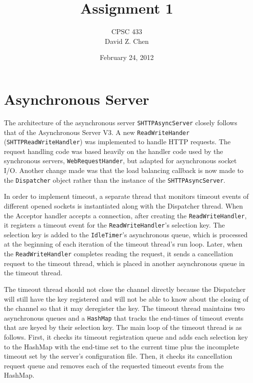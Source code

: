 \documentclass[letterpaper,12pt]{article}
\begin{document}
\title{Assignment 1}
\date{February 24, 2012}
\author{CPSC 433 \\ David Z. Chen}

\maketitle

\section{Asynchronous Server}

The architecture of the asynchronous server \texttt{SHTTPAsyncServer} closely follows that of the Asynchronous Server V3. A new \texttt{ReadWriteHander} (\texttt{SHTTPReadWriteHandler}) was implemented to handle HTTP requests. The request handling code was based heavily on the handler code used by the synchronous servers, \texttt{WebRequestHander}, but adapted for asynchronous socket I/O. Another change made was that the load balancing callback is now made to the \texttt{Dispatcher} object rather than the instance of the \texttt{SHTTPAsyncServer}.

In order to implement timeout, a separate thread that monitors timeout events of different opened sockets is instantiated along with the Dispatcher thread. When the Acceptor handler accepts a connection, after creating the \texttt{ReadWriteHandler}, it registers a timeout event for the \texttt{ReadWriteHandler}'s selection key. The selection key is added to the \texttt{IdleTimer}'s asynchronous queue, which is processed at the beginning of each iteration of the timeout thread's run loop. Later, when the \texttt{ReadWriteHandler} completes reading the request, it sends a cancellation request to the timeout thread, which is placed in another asynchronous queue in the timeout thread.

The timeout thread should not close the channel directly because the Dispatcher will still have the key registered and will not be able to know about the closing of the channel so that it may deregister the key. The timeout thread maintains two asynchronous queues and a \texttt{HashMap} that tracks the end-times of timeout events that are keyed by their selection key. The main loop of the timeout thread is as follows. First, it checks its timeout registration queue and adds each selection key to the HashMap with the end-time set to the current time plus the incomplete timeout set by the server's configuration file. Then, it checks its cancellation request queue and removes each of the requested timeout events from the HashMap. 
\end{document}
